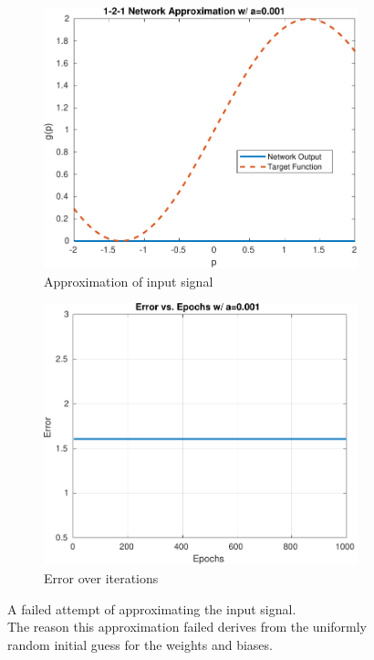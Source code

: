\begin{figure}[htpb]
	\centering
	\begin{subfigure}{0.47\textwidth}
		\centering
		\includegraphics[width=\textwidth]{../Problem 4/1_2_1_failed_approximation.pdf}
		\caption{Approximation of input signal}
	\end{subfigure}
	\begin{subfigure}{0.47\textwidth}
		\centering
		\includegraphics[width=\textwidth]{../Problem 4/1_2_1_failed_approximation_error.pdf}
		\caption{Error over iterations}
	\end{subfigure}
	\caption{A failed attempt of approximating the input signal. \\ The reason this approximation failed derives from the uniformly random initial guess for the weights and biases.}
	\label{fig:prob4_1_2_1_failed_attempt}
\end{figure}